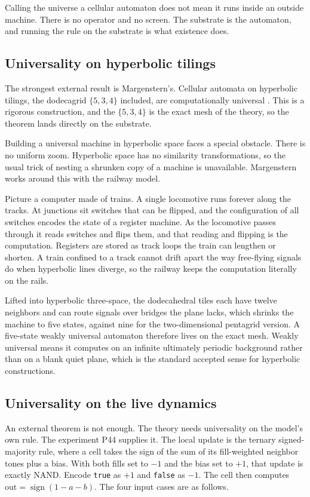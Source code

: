 Calling the
universe a cellular automaton does not mean it runs inside an outside machine. There is no operator and no
screen. The substrate is the automaton, and running the rule on the substrate is what existence does.

\subsection{Universality on hyperbolic tilings}

The strongest external result is Margenstern's. Cellular automata on hyperbolic tilings, the dodecagrid
$\{5,3,4\}$ included, are computationally universal \cite{margenstern2013}. This is a rigorous
construction, and the $\{5,3,4\}$ is the exact mesh of the theory, so the theorem lands directly on the
substrate.

Building a universal machine in hyperbolic space faces a special obstacle. There is no uniform zoom.
Hyperbolic space has no similarity transformations, so the usual trick of nesting a shrunken copy of a
machine is unavailable. Margenstern works around this with the railway model.

Picture a computer made of
trains. A single locomotive runs forever along the tracks. At junctions sit switches that can be flipped,
and the configuration of all switches encodes the state of a register machine. As the locomotive passes
through it reads switches and flips them, and that reading and flipping is the computation. Registers are
stored as track loops the train can lengthen or shorten. A train confined to a track cannot drift apart the
way free-flying signals do when hyperbolic lines diverge, so the railway keeps the computation literally on
the rails.

Lifted into hyperbolic three-space, the dodecahedral tiles each have twelve neighbors and can
route signals over bridges the plane lacks, which shrinks the machine to five states, against nine for the
two-dimensional pentagrid version. A five-state weakly universal automaton therefore lives on the exact
mesh. Weakly universal means it computes on an infinite ultimately periodic background rather than on a
blank quiet plane, which is the standard accepted sense for hyperbolic constructions.

\subsection{Universality on the live dynamics}

An external theorem is not enough. The theory needs universality on the model's own rule. The experiment
P44 supplies it. The local update is the ternary signed-majority rule, where a cell takes the sign of the
sum of its fill-weighted neighbor tones plus a bias. With both fills set to $-1$ and the bias set to $+1$,
that update is exactly NAND. Encode \texttt{true} as $+1$ and \texttt{false} as $-1$. The cell then
computes $\mathrm{out} = \operatorname{sign}(1 - a - b)$. The four input cases are as follows.

